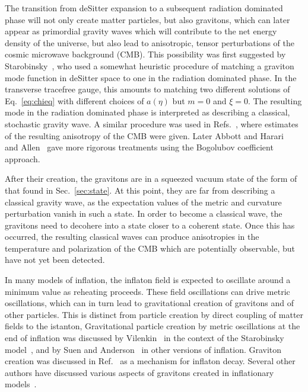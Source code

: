 \documentclass[12pt,onecolumn,eqsecnum,floats,aps,prd,floatfix,titlepage,tightenlines]{revtex4-2}
\begin{document}
The transition from deSitter expansion to a subsequent radiation dominated phase will not only create matter particles,
but also gravitons, which can later appear as primordial gravity waves which will contribute to the net energy density
of the universe, but also lead to anisotropic, tensor perturbations of the cosmic microwave background (CMB). This possibility
was first suggested by Starobinsky~\cite{S79}, who used a  somewhat heuristic procedure of matching  a graviton mode
function in deSitter space to one in the radiation dominated phase. In the transverse tracefree gauge, this amounts to
matching two different solutions of Eq.~\eqref{eq:chieq} with different choices of $a(\eta)$ but $m=0$ and $\xi =0$.
The resulting mode in the radiation dominated phase  is interpreted as describing a classical, stochastic gravity wave.
A similar procedure was used in Refs.~\cite{RSV82,FP83,AW84a,AW84b}, where estimates of the resulting anisotropy
of the CMB were given. Later Abbott and Harari~\cite{AH86} and Allen~\cite{A88} gave more rigorous treatments using
the Bogolubov coefficient approach.

After their creation, the gravitons are in a squeezed vacuum state of the form of that found in Sec.~\ref{sec:state}. At
this point, they are far from describing a classical gravity wave, as the expectation values of the metric and curvature
perturbation vanish in such a state. In order to become a classical wave, the gravitons need to decohere into a state
closer to a coherent state.
Once this has occurred, the resulting classical waves can produce anisotropies in the temperature and polarization of the
CMB which are potentially  observable, but have not yet been detected.

In many models of inflation, the inflaton field is expected to oscillate around a minimum value as reheating proceeds.
These field oscillations can drive metric oscillations, which can in turn lead to gravitational creation of gravitons and
of other particles. This is distinct from particle creation by direct coupling of matter fields to the istanton, Gravitational
particle creation by metric oscillations at the end of inflation was discussed by Vilenkin~\cite{Vilenkin:1985} in the context of the
Starobinsky model~\cite{Starobinsky80}, and by Suen and Anderson~\cite{SA87} in other  versions of inflation.
Graviton creation was discussed in Ref.~\cite{Ema:2015}  as a mechanism for inflaton decay. 
Several other authors have discussed various aspects of gravitons created in inflationary 
models~\cite{Yainik90,Grishchuk-Sidorov90,Maia93,Henriques94,Mendes99,Allen2000,Henriques04,Giovannini20}. 
\end{document}
